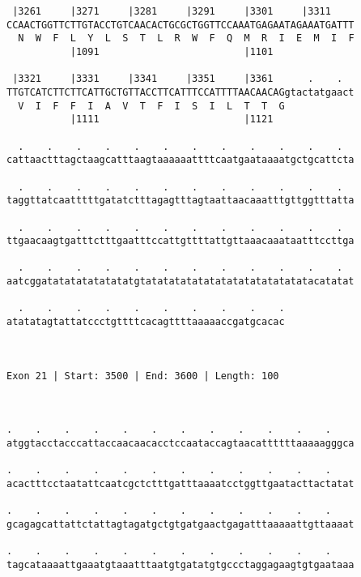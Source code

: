 \documentclass{article}
\begin{document}
\begin{Verbatim}
 |3261     |3271     |3281     |3291     |3301     |3311    
CCAACTGGTTCTTGTACCTGTCAACACTGCGCTGGTTCCAAATGAGAATAGAAATGATTT
  N  W  F  L  Y  L  S  T  L  R  W  F  Q  M  R  I  E  M  I  F
           |1091                         |1101              
  
 |3321     |3331     |3341     |3351     |3361      .    .  
TTGTCATCTTCTTCATTGCTGTTACCTTCATTTCCATTTTAACAACAGgtactatgaact
  V  I  F  F  I  A  V  T  F  I  S  I  L  T  T  G            
           |1111                         |1121              
  
  .    .    .    .    .    .    .    .    .    .    .    .  
cattaactttagctaagcatttaagtaaaaaattttcaatgaataaaatgctgcattcta
                                                            
  .    .    .    .    .    .    .    .    .    .    .    .  
taggttatcaatttttgatatctttagagtttagtaattaacaaatttgttggtttatta
                                                            
  .    .    .    .    .    .    .    .    .    .    .    .  
ttgaacaagtgatttctttgaatttccattgttttattgttaaacaaataatttccttga
                                                            
  .    .    .    .    .    .    .    .    .    .    .    .  
aatcggatatatatatatatatgtatatatatatatatatatatatatatatacatatat
                                                            
  .    .    .    .    .    .    .    .    .    .
atatatagtattatccctgttttcacagttttaaaaaccgatgcacac
                                                
                                                
 
Exon 21 | Start: 3500 | End: 3600 | Length: 100



.    .    .    .    .    .    .    .    .    .    .    .    
atggtacctacccattaccaacaacacctccaataccagtaacattttttaaaaagggca
                                                            
.    .    .    .    .    .    .    .    .    .    .    .    
acactttcctaatattcaatcgctctttgatttaaaatcctggttgaatacttactatat
                                                            
.    .    .    .    .    .    .    .    .    .    .    .    
gcagagcattattctattagtagatgctgtgatgaactgagatttaaaaattgttaaaat
                                                            
.    .    .    .    .    .    .    .    .    .    .    .    
tagcataaaattgaaatgtaaatttaatgtgatatgtgccctaggagaagtgtgaataaa
                                                            

\end{Verbatim}
\end{document}
